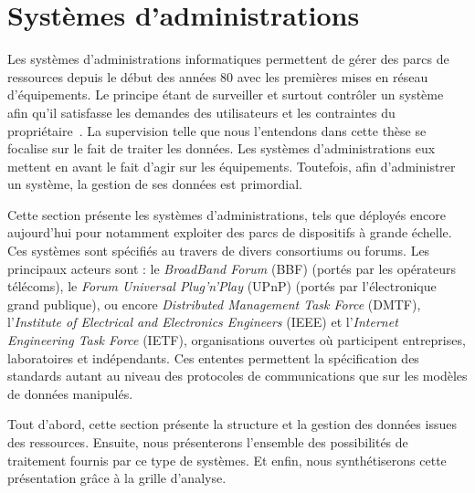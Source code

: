 \section{Systèmes d'administrations}\label{sec:rw:supervision:administration}
Les systèmes d'administrations informatiques permettent de gérer des parcs de ressources depuis le début des années 80 avec les premières mises en réseau d'équipements. Le principe étant de surveiller et surtout contrôler un système afin qu'il satisfasse les demandes des utilisateurs et les contraintes du propriétaire~\cite{Sloman:management}. La supervision telle que nous l'entendons dans cette thèse se focalise sur le fait de traiter les données. Les systèmes d'administrations eux mettent en avant le fait d'agir sur les équipements. Toutefois, afin d'administrer un système, la gestion de ses données est primordial.

Cette section présente les systèmes d'administrations, tels que déployés encore aujourd'hui pour notamment exploiter des parcs de dispositifs à grande échelle. Ces systèmes sont spécifiés au travers de divers consortiums ou forums. Les principaux acteurs sont : le \textit{BroadBand Forum} (BBF) (portés par les opérateurs télécoms), le \textit{Forum Universal Plug'n'Play} (UPnP) (portés par l'électronique grand publique), ou encore \textit{Distributed Management Task Force} (DMTF), l'\textit{Institute of Electrical and Electronics Engineers} (IEEE) et l'\textit{Internet Engineering Task Force} (IETF), organisations ouvertes où participent entreprises, laboratoires et indépendants. Ces ententes permettent la spécification des standards autant au niveau des protocoles de communications que sur les modèles de données manipulés.

Tout d'abord, cette section présente la structure et la gestion des données issues des ressources. Ensuite, nous présenterons l'ensemble des possibilités de traitement fournis par ce type de systèmes. Et enfin, nous synthétiserons cette présentation grâce à la grille d'analyse.
